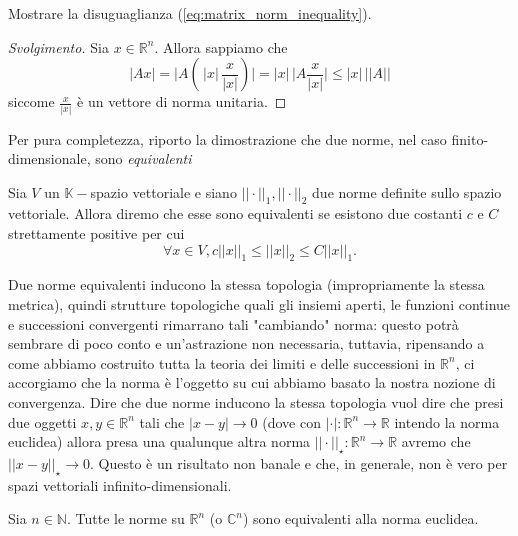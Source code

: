 \begin{exercise}
    Mostrare la disuguaglianza (\ref{eq:matrix_norm_inequality}).
\end{exercise}
\begin{proof}[Svolgimento]
    Sia $x \in \mathbb{R}^n$. Allora sappiamo che
    $$
    |Ax| = \big|A( \, |x| \, \frac{x}{|x|} )\big| = |x| \, \big|A\frac{x}{|x|}\big| \leq |x| \, || A ||
    $$
    siccome $\frac{x}{|x|}$ è un vettore di norma unitaria.
\end{proof}
Per pura completezza, riporto la dimostrazione che due norme, nel caso finito-dimensionale, sono \emph{equivalenti}
\begin{definition}
    Sia $V$ un $\mathbb{K}-$spazio vettoriale e siano $||\cdot||_1, ||\cdot||_2$ due norme definite sullo spazio vettoriale. Allora diremo che esse sono equivalenti se esistono due costanti $c$ e $C$ strettamente positive per cui
    \begin{equation}
        \forall x \in V, c||x||_1 \leq ||x||_2 \leq C||x||_1.
    \end{equation}
\end{definition}
\begin{remark}
    Due norme equivalenti inducono la stessa topologia (impropriamente la stessa metrica), quindi strutture topologiche quali gli insiemi aperti, le funzioni continue e successioni convergenti rimarrano tali "cambiando" norma: questo potrà sembrare di poco conto e un'astrazione non necessaria, tuttavia, ripensando a come abbiamo costruito tutta la teoria dei limiti e delle successioni in $\mathbb{R}^n$, ci accorgiamo che la norma è l'oggetto su cui abbiamo basato la nostra nozione di convergenza. Dire che
    due norme inducono la stessa topologia vuol dire che presi due oggetti $x, y \in \mathbb{R}^n$ tali che $|x - y| \to 0$ (dove con $|\cdot|: \mathbb{R}^n \to \mathbb{R}$ intendo la norma euclidea) allora presa una qualunque altra norma $||\cdot||_{\star}: \mathbb{R}^n \to \mathbb{R}$ avremo che $||x - y||_{\star} \to 0$. 
    Questo è un risultato non banale e che, in generale, non è vero per spazi vettoriali infinito-dimensionali.
\end{remark}
\begin{prop}
    Sia $n \in \mathbb{N}$. Tutte le norme su $\mathbb{R}^n$ (o $\mathbb{C}^n$) sono equivalenti alla norma euclidea.
    \label{thm:equiv_norme_euclidea}
\end{prop}
